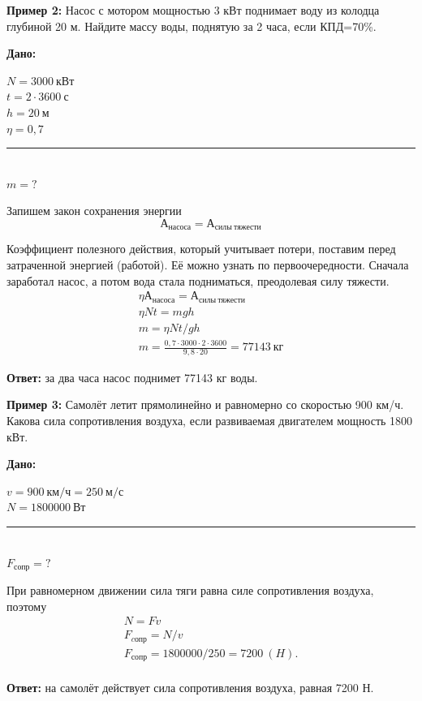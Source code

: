 \documentclass[a5paper, 10pt]{diss_4}
\renewcommand{\'}{\,'}
\begin{document}
\textbf{Пример 2:}  Насос с мотором мощностью 3 кВт поднимает воду из колодца глубиной 20 м.
Найдите массу воды, поднятую за 2 часа, если КПД=70\%.

\hspace{1cm}\textbf{Дано:}\hspace{.3cm}
\parbox[t]{4cm}{
$N= 3000\ кВт$\\
$t= 2\cdot3600\ с$\\
$h= 20\ м$\\
$\eta=0,7$\\
\rule{4cm}{.4pt}\\
$m= ?$\\
}

Запишем закон сохранения энергии
\[
А_{насоса}=А_{силы\ тяжести}
\]

Коэффициент полезного действия, который учитывает потери, поставим перед затраченной энергией (работой). Её можно узнать по первоочередности. Сначала заработал насос, а потом вода стала подниматься, преодолевая силу тяжести.
\begin{gather*}
\eta А_{насоса}=А_{силы\ тяжести}\\
\eta Nt=mgh\\
m=\eta Nt/gh\\
m=\frac{0,7\cdot3000\cdot2\cdot3600}{9,8\cdot20}=77143\ кг
\end{gather*}

\textbf{Ответ:} за два часа насос поднимет 77143 кг воды.

\textbf{Пример 3:}  Самолёт летит прямолинейно и равномерно со скоростью 900 км/ч. Какова сила сопротивления воздуха, если развиваемая двигателем мощность 1800 кВт.

\hspace{1cm}\textbf{Дано:}\hspace{.3cm}
\parbox[t]{4.5cm}{
$v= 900\ км/ч=250\ м/с$\\
$N= 1800000\ Вт$\\
\rule{4cm}{.4pt}\\
$F_{сопр}= ?$\\
}

При равномерном движении сила тяги равна силе сопротивления воздуха, поэтому
\begin{gather*}
N=Fv\\
F_{cопр}=N/v\\
F_{сопр}=1800000/250=7200\ (H).\\
\end{gather*}

\textbf{Ответ:} на самолёт действует сила сопротивления воздуха, равная 7200 Н.
\end{document}
